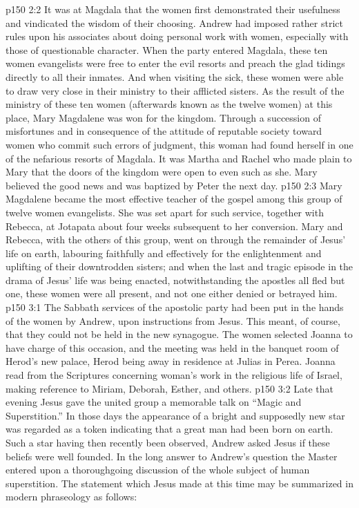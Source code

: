 \vs p150 2:2 It was at Magdala that the women first demonstrated their usefulness and vindicated the wisdom of their choosing. Andrew had imposed rather strict rules upon his associates about doing personal work with women, especially with those of questionable character. When the party entered Magdala, these ten women evangelists were free to enter the evil resorts and preach the glad tidings directly to all their inmates. And when visiting the sick, these women were able to draw very close in their ministry to their afflicted sisters. As the result of the ministry of these ten women (afterwards known as the twelve women) at this place, Mary Magdalene was won for the kingdom. Through a succession of misfortunes and in consequence of the attitude of reputable society toward women who commit such errors of judgment, this woman had found herself in one of the nefarious resorts of Magdala. It was Martha and Rachel who made plain to Mary that the doors of the kingdom were open to even such as she. Mary believed the good news and was baptized by Peter the next day.
\vs p150 2:3 Mary Magdalene became the most effective teacher of the gospel among this group of twelve women evangelists. She was set apart for such service, together with Rebecca, at Jotapata about four weeks subsequent to her conversion. Mary and Rebecca, with the others of this group, went on through the remainder of Jesus’ life on earth, labouring faithfully and effectively for the enlightenment and uplifting of their downtrodden sisters; and when the last and tragic episode in the drama of Jesus’ life was being enacted, notwithstanding the apostles all fled but one, these women were all present, and not one either denied or betrayed him.
\vs p150 3:1 The Sabbath services of the apostolic party had been put in the hands of the women by Andrew, upon instructions from Jesus. This meant, of course, that they could not be held in the new synagogue. The women selected Joanna to have charge of this occasion, and the meeting was held in the banquet room of Herod’s new palace, Herod being away in residence at Julias in Perea. Joanna read from the Scriptures concerning woman’s work in the religious life of Israel, making reference to Miriam, Deborah, Esther, and others.
\vs p150 3:2 \pc Late that evening Jesus gave the united group a memorable talk on “Magic and Superstition.” In those days the appearance of a bright and supposedly new star was regarded as a token indicating that a great man had been born on earth. Such a star having then recently been observed, Andrew asked Jesus if these beliefs were well founded. In the long answer to Andrew’s question the Master entered upon a thoroughgoing discussion of the whole subject of human superstition. The statement which Jesus made at this time may be summarized in modern phraseology as follows:
